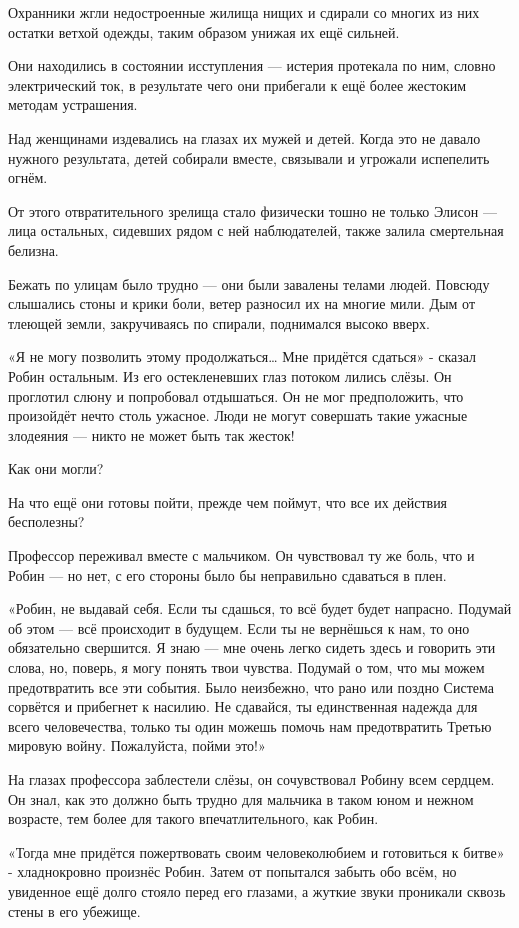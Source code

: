 \documentclass[a4paper,12pt]{book}
\begin{document}
\par
Охранники жгли недостроенные жилища нищих и сдирали со многих из них остатки ветхой одежды, таким образом унижая их ещё сильней.
\par
Они находились в состоянии исступления — истерия протекала по ним, словно электрический ток, в результате чего они прибегали к ещё более жестоким методам устрашения.
\par
Над женщинами издевались на глазах их мужей и детей. Когда это не давало нужного результата, детей собирали вместе, связывали и угрожали испепелить огнём.
\par
От этого отвратительного зрелища стало физически тошно не только Элисон — лица остальных, сидевших рядом с ней наблюдателей, также залила смертельная белизна.\\
\par
Бежать по улицам было трудно — они были завалены телами людей. Повсюду слышались стоны и крики боли, ветер разносил их на многие мили. Дым от тлеющей земли, закручиваясь по спирали, поднимался высоко вверх.
\par
«Я не могу позволить этому продолжаться… Мне придётся сдаться» - сказал Робин остальным. Из его остекленевших глаз потоком лились слёзы. Он проглотил слюну и попробовал отдышаться. Он не мог предположить, что произойдёт нечто столь ужасное. Люди не могут совершать такие ужасные злодеяния — никто не может быть так жесток!
\par
Как они могли?
\par
На что ещё они готовы пойти, прежде чем поймут, что все их действия бесполезны?\\
\par
Профессор переживал вместе с мальчиком. Он чувствовал ту же боль, что и Робин — но нет, с его стороны было бы неправильно сдаваться в плен.
\par
«Робин, не выдавай себя. Если ты сдашься, то всё будет будет напрасно. Подумай об этом — всё происходит в будущем. Если ты не вернёшься к нам, то оно обязательно свершится. Я знаю — мне очень легко сидеть здесь и говорить эти слова, но, поверь, я могу понять твои чувства. Подумай о том, что мы можем предотвратить все эти события. Было неизбежно, что рано или поздно Система сорвётся и прибегнет к насилию. Не сдавайся, ты единственная надежда для всего человечества, только ты один можешь помочь нам предотвратить Третью мировую войну. Пожалуйста, пойми это!»
\par
На глазах профессора заблестели слёзы, он сочувствовал Робину всем сердцем. Он знал, как это должно быть трудно для мальчика в таком юном и нежном возрасте, тем более для такого впечатлительного, как Робин.\\
\par
«Тогда мне придётся пожертвовать своим человеколюбием и готовиться к битве» - хладнокровно произнёс Робин. Затем от попытался забыть обо всём, но увиденное ещё долго стояло перед его глазами, а жуткие звуки проникали сквозь стены в его убежище.\\
\end{document}
